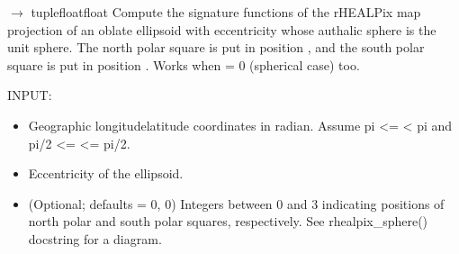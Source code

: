 \documentclass[a4paper,12ptopenany,oneside,english]{sphinxmanual}
\begin{document}

\begin{fulllineitems}
\label{\detokenize{pj_rhealpix:rhealpixdggs.pj_rhealpix.rhealpix_ellipsoid}}
\pysigstartsignatures
\pysiglinewithargsret
{}
{\sphinxparamcomma {}\sphinxparamcomma {}\sphinxparamcomma {}\sphinxparamcomma {}\sphinxparamcomma {}}
{{ $\rightarrow$ tuple\DUrole{p}{{[}}floatfloat\DUrole{p}{{]}}}}
\pysigstopsignatures
\sphinxAtStartPar
Compute the signature functions of the rHEALPix map
projection of an oblate ellipsoid with eccentricity  whose
authalic sphere is the unit sphere.
The north polar square is put in position ,
and the south polar square is put in position .
Works when  = 0 (spherical case) too.

\sphinxAtStartPar
INPUT:
\begin{itemize}
\item {} 
\sphinxAtStartPar
{} \sphinxhyphen{} Geographic longitude\sphinxhyphen{}latitude coordinates in radian.
Assume \sphinxhyphen{}pi \textless{}=  \textless{} pi and \sphinxhyphen{}pi/2 \textless{}=  \textless{}= pi/2.

\item {} 
\sphinxAtStartPar
{} \sphinxhyphen{} Eccentricity of the ellipsoid.

\item {} 
\sphinxAtStartPar
{} \sphinxhyphen{} (Optional; defaults = 0, 0) Integers
between 0 and 3 indicating positions of north polar and
south polar squares, respectively.
See rhealpix\_sphere() docstring for a diagram.


\end{itemize}
\end{fulllineitems}
\end{document}
